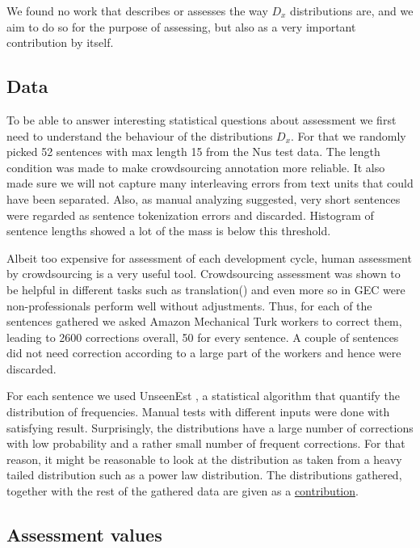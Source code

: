 \documentclass[english]{article}
\begin{document}
We found no work that describes or assesses the way $D_x$ distributions are, and we aim to do so for the purpose of assessing, but also as a very important contribution by itself. 

\subsection{Data}
To be able to answer interesting statistical questions about assessment we first need to understand the behaviour of the distributions $D_x$. For that we randomly picked 52 sentences with max length 15 from the Nus \cite{dahlmeier2013building} test data. The length condition was made to make crowdsourcing annotation more reliable. It also made sure we will not capture many interleaving errors from text units that could have been separated. Also, as manual analyzing suggested, very short sentences were regarded as sentence tokenization errors and discarded. Histogram of sentence lengths showed a lot of the mass is below this threshold.

Albeit too expensive for assessment of each development cycle, human assessment by crowdsourcing is a very useful tool. Crowdsourcing assessment was shown to be helpful in different tasks such as translation(\cite{birch2016hume,zaidan2011crowdsourcing,post2012constructing}) and even more so in GEC \cite{madnani2011they} were non-professionals perform well without adjustments. Thus, for each of the sentences gathered we asked Amazon Mechanical Turk workers to correct them, leading to 2600 corrections overall, 50 for every sentence. A couple of sentences did not need correction according to a large part of the workers and hence were discarded.

For each sentence we used UnseenEst \cite{zou2015quantifying}, a statistical algorithm that quantify the distribution of frequencies. Manual tests with different inputs were done with satisfying result. Surprisingly, the distributions have a large number of corrections with low probability and a rather small number of frequent corrections. For that reason, it might be reasonable to look at the distribution as taken from a heavy tailed distribution such as a power law distribution. The distributions gathered, together with the rest of the gathered data are given as a \href{https://github.com/borgr/assess_learner_language}{contribution}.

\subsection{Assessment values\label{sec:Assessment-values}}
\end{document}
